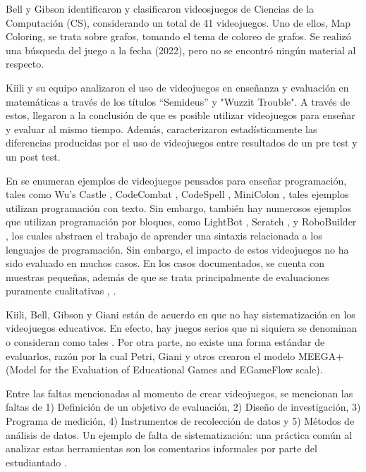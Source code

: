 \documentclass[submission]{eptcs}
\begin{document}
Bell y Gibson \cite{evaluation_of_games_for_teaching_cs} identificaron y clasificaron videosjuegos de Ciencias de la Computación (CS),
considerando un total de 41 videojuegos. Uno de ellos, Map Coloring, se trata sobre grafos, tomando el tema de coloreo de grafos.
Se realizó una búsqueda del juego a la fecha (2022), pero no se encontró ningún material al respecto.

Kiili y su equipo \cite{using_videogames_maths} analizaron el uso de videojuegos en enseñanza
y evaluación en matemáticas a través de los títulos ``Semideus'' y "Wuzzit Trouble". A través
de estos, llegaron a la conclusión de que es posible utilizar videojuegos para enseñar y
evaluar al mismo tiempo. Además, caracterizaron estadísticamente las diferencias producidas por el uso
de videojuegos entre resultados de un pre test y un post test.

En \cite{video_game_foster_computational_thinking} se enumeran ejemplos de videojuegos pensados para enseñar programación,
tales como Wu's Castle \cite{wuscastle}, CodeCombat \cite{CodeCombat}, CodeSpell \cite{codespells}, MiniColon \cite{minicolon},
tales ejemplos utilizan programación con texto. Sin embargo, también hay numerosos ejemplos que utilizan programación por
bloques, como LightBot \cite{LightBot}, Scratch \cite{maloney2010scratch}, \cite{scratch} y RoboBuilder \cite{RoboBuilder}, los
cuales abstraen el trabajo de aprender una sintaxis relacionada a los lenguajes de programación.
Sin embargo, el impacto de estos videojuegos no ha sido evaluado en muchos casos. En los casos documentados, se cuenta con
muestras pequeñas, además de que se trata principalmente de evaluaciones puramente cualitativas \cite{video_game_foster_computational_thinking},
\cite{effectiveness_gbl}.


Kiili, Bell, Gibson y Giani \cite{petri2018method} están de acuerdo en que no hay sistematización
en los videojuegos educativos. En efecto, hay juegos serios que ni siquiera se denominan o consideran como tales
\cite{evaluation_of_games_for_teaching_cs}. Por otra parte, no existe una forma estándar de evaluarlos, razón por
la cual Petri, Giani y otros \cite{petri2018method} crearon el modelo MEEGA+ (Model for the Evaluation of Educational
Games and EGameFlow scale).

Entre las faltas mencionadas al momento de crear videojuegos, se mencionan las faltas de 1) Definición de un objetivo
de evaluación, 2) Diseño de investigación, 3) Programa de medición, 4) Instrumentos de recolección de datos y 5) Métodos
de análisis de datos. Un ejemplo de falta de sistematización: una práctica común al analizar estas herramientas son los 
comentarios informales por parte del estudiantado \cite{petri2018method}.
\end{document}
